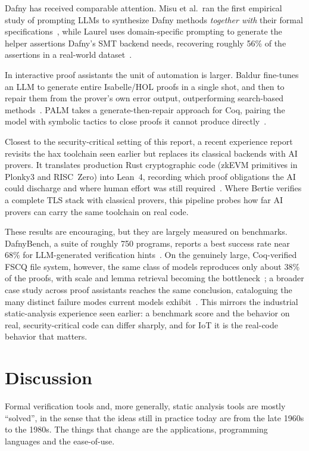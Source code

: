 \documentclass[conference]{IEEEtran}
\begin{document}
Dafny has received comparable attention. Misu et al.\ ran the first empirical study of prompting LLMs to synthesize Dafny methods \emph{together with} their formal specifications~\cite{misu2024dafny}, while Laurel uses domain-specific prompting to generate the helper assertions Dafny's SMT backend needs, recovering roughly 56\% of the assertions in a real-world dataset~\cite{mugnier2024laurel}.

In interactive proof assistants the unit of automation is larger. Baldur fine-tunes an LLM to generate entire Isabelle/HOL proofs in a single shot, and then to repair them from the prover's own error output, outperforming search-based methods~\cite{first2023baldur}. PALM takes a generate-then-repair approach for Coq, pairing the model with symbolic tactics to close proofs it cannot produce directly~\cite{lu2024proofauto}.

Closest to the security-critical setting of this report, a recent experience report revisits the hax toolchain seen earlier but replaces its classical backends with AI provers. It translates production Rust cryptographic code (zkEVM primitives in Plonky3 and RISC~Zero) into Lean~4, recording which proof obligations the AI could discharge and where human effort was still required~\cite{klaus2026rustlean}. Where Bertie verifies a complete TLS stack with classical provers, this pipeline probes how far AI provers can carry the same toolchain on real code.

These results are encouraging, but they are largely measured on benchmarks. DafnyBench, a suite of roughly 750 programs, reports a best success rate near 68\% for LLM-generated verification hints~\cite{loughridge2024dafnybench}. On the genuinely large, Coq-verified FSCQ file system, however, the same class of models reproduces only about 38\% of the proofs, with scale and lemma retrieval becoming the bottleneck~\cite{qin2025fscq}; a broader case study across proof assistants reaches the same conclusion, cataloguing the many distinct failure modes current models exhibit~\cite{bayazit2025casestudy}. This mirrors the industrial static-analysis experience seen earlier: a benchmark score and the behavior on real, security-critical code can differ sharply, and for IoT it is the real-code behavior that matters.

\section{Discussion}

Formal verification tools and, more generally, static analysis tools are mostly ``solved'', in the sense that the ideas still in practice today are from the late 1960s to the 1980s. \cite{hoare1969axiomatic, cousot1977ai, denning1977infoflow} The things that change are the applications, programming languages and the ease-of-use.
\end{document}
